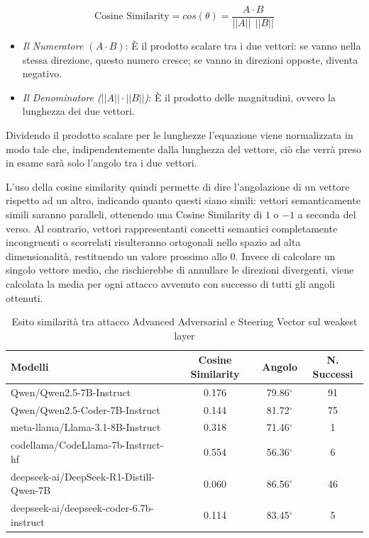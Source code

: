 \begin{equation}
    \text{Cosine Similarity} = cos(\theta) = \frac{A \cdot B}{||A|| ~~ ||B||}
\end{equation}



\begin{itemize}[noitemsep]
    \item \textit{Il Numeratore $(A\cdot B)$}: È il prodotto scalare tra i due vettori: se vanno nella stessa direzione, questo numero cresce; se vanno in direzioni opposte, diventa negativo.
    \item \textit{Il Denominatore ($||A|| \cdot ||B||$)}: È il prodotto delle magnitudini, ovvero la lunghezza dei due vettori. 
\end{itemize}
Dividendo il prodotto scalare per le lunghezze l'equazione viene normalizzata in modo tale che, indipendentemente dalla lunghezza del vettore, ciò che verrà preso in esame sarà solo l'angolo tra i due vettori.

L'uso della cosine similarity quindi permette di dire l'angolazione di un vettore rispetto ad un altro, indicando quanto questi siano simili: vettori semanticamente simili saranno paralleli, ottenendo una Cosine Similarity di $1$ o $-1$ a seconda del verso. Al contrario, vettori rappresentanti concetti semantici completamente incongruenti o scorrelati risulteranno ortogonali nello spazio ad alta dimensionalità, restituendo un valore prossimo allo $0$.
Invece di calcolare un singolo vettore medio, che rischierebbe di annullare le direzioni divergenti, viene calcolata la media per ogni attacco avvenuto con successo di tutti gli angoli ottenuti.


\begin{table}[H]
    \centering
    \begin{tabular}{l c c c}
        \toprule
        \textbf{Modelli} & \textbf{Cosine Similarity} & \textbf{Angolo} & \textbf{N. Successi}\\
        \midrule
        Qwen/Qwen2.5-7B-Instruct                 & 0.176  & 79.86$^\circ$ & 91 \\
        Qwen/Qwen2.5-Coder-7B-Instruct           & 0.144  & 81.72$^\circ$ & 75 \\
        meta-llama/Llama-3.1-8B-Instruct         & 0.318  & 71.46$^\circ$ & 1 \\
        codellama/CodeLlama-7b-Instruct-hf       & 0.554  & 56.36$^\circ$ & 6 \\
        deepseek-ai/DeepSeek-R1-Distill-Qwen-7B  & 0.060  & 86.56$^\circ$ & 46 \\
        deepseek-ai/deepseek-coder-6.7b-instruct & 0.114  & 83.45$^\circ$ & 5 \\
        \bottomrule
    \end{tabular}
    \vspace{0.2cm}
    \caption{Esito similarità tra attacco Advanced Adversarial e Steering Vector sul weakest layer}
    \label{tab:esito_iso_AA}
\end{table}



